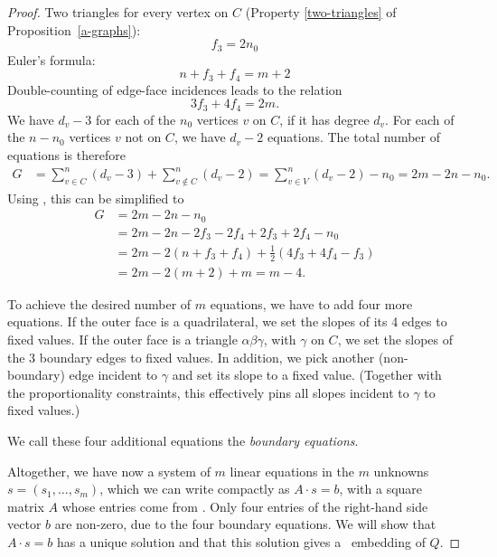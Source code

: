 \begin{proof}
Two triangles for every vertex on $C$ (Property \ref{two-triangles}
of Proposition~\ref{a-graphs}):
\begin{equation}
  \label{eq:f3}
  f_3 = 2n_0
\end{equation}
Euler's formula:
\begin{equation}
  \label{eq:Euler}
  n + f_3+f_4 = m+2
\end{equation}
Double-counting of edge-face incidences leads to the relation
\begin{equation}
  \label{eq:edge-face}
  3f_3+4f_4=2m.
\end{equation}
We have $d_v-3$ for each of the $n_0$ vertices $v$ on $C$, if it has
degree $d_v$. For each of the 
 $n-n_0$ vertices $v$ not on $C$, 
we have $d_v-2$ equations.
  The total number of equations is therefore
  \begin{align*}
G &= 
\sum_{v\in C}^n(d_v-3)+
\sum_{v\notin C}^n(d_v-2)
=
\sum_{v\in V}^n(d_v-2)-n_0
=
2m-2n-n_0.
  \end{align*}
Using \thetag{\ref{eq:f3}--\ref{eq:edge-face}}, this can be
simplified to
\begin{align*}
G&=
2m-2n-n_0\\
&= 2m -2n -2f_3-2f_4 +2f_3+2f_4-n_0\\
&= 2m -2(n +f_3+f_4) +\tfrac12(4f_3+4f_4-f_3)\\
&= 2m -2(m+2) +m = m-4.
\end{align*}

To achieve the desired number of $m$ equations, we have to add four
more equations.
If the outer face is a quadrilateral, we set the slopes of its
 4 edges
to fixed values.
If the outer face is a triangle $\alpha\beta\gamma$, with $\gamma$ on
$C$, we set the slopes of the 3 boundary edges
to fixed values. In addition, we pick another (non-boundary) edge
incident to $\gamma$ and set its slope to a fixed value.
(Together with the proportionality constraints, this effectively pins
all slopes
incident to $\gamma$ to fixed values.)

We call these four additional equations the \emph{boundary equations}.

Altogether, we have now a system of $m$ linear equations
in the $m$ unknowns $s=(s_1,\ldots,s_m)$, which we can write
compactly as
 $A\cdot s = b$, with a square matrix $A$ whose entries come from
 \thetag{\ref{eq:slope0}--\ref{eq:proportion2}}.
Only four entries of
the right-hand side vector
 $b$
are non-zero, due to the four boundary equations.
We will show that $A\cdot s=b$ has a unique
solution and that this solution gives a \Fary\ embedding of $Q$.


\end{proof}
